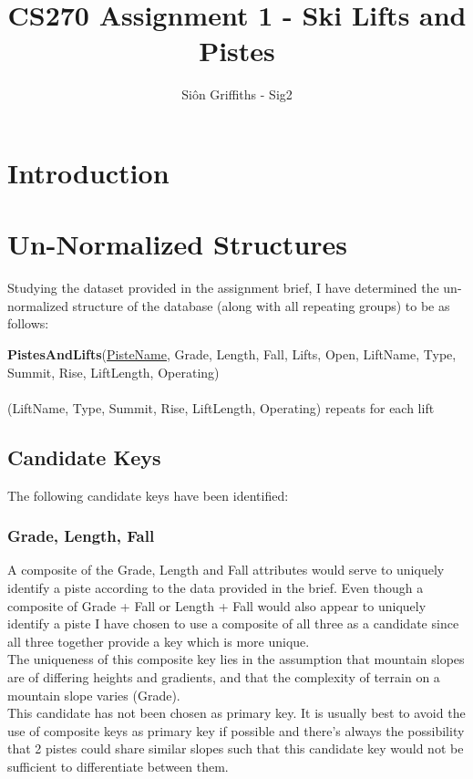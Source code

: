 \documentclass[titlepage ,12pt]{article}
\title{CS270 Assignment 1 - Ski Lifts and Pistes}
\author{Si\^{o}n Griffiths - Sig2}
\begin{document}
\maketitle
\newpage
\tableofcontents
\clearpage


\section{Introduction}

\section{Un-Normalized Structures}

Studying the dataset provided in the assignment brief, I have determined the un-normalized structure of the database (along with all repeating groups) to be as follows:
 
\textbf{PistesAndLifts}(\underline{PisteName}, Grade, Length, Fall, Lifts, Open, LiftName, Type, Summit, Rise, LiftLength, Operating) \\ \\
(LiftName, Type, Summit, Rise, LiftLength, Operating) repeats for each lift
 \newline

\subsection{Candidate Keys}
The following candidate keys have been identified: 

\subsubsection{Grade, Length, Fall}

A composite of the Grade, Length and Fall attributes would serve to uniquely identify a piste according to the data provided in the brief. Even though a composite of Grade + Fall or Length + Fall would also appear to uniquely identify a piste I have chosen to use a composite of all three as a candidate since all three together provide a key which is more unique. \\
The uniqueness of this composite key lies in the assumption that mountain slopes are of differing heights and gradients, and that the complexity of terrain on a mountain slope varies (Grade). \\
This candidate has not been chosen as primary key. It is usually best to avoid the use of composite keys as primary key if possible and there's always the possibility that 2 pistes could share similar slopes such that this candidate key would not be sufficient to differentiate between them.
\end{document}
